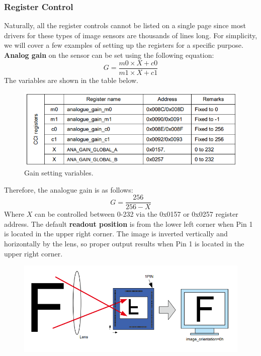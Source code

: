 \documentclass[10pt]{article}
\begin{document}
\begin{multicols}{2}
\subsubsection{Register Control}
Naturally, all the register controls cannot be listed on a single page since most drivers for these types of image sensors are thousands of lines long. For simplicity, we will cover a few examples of setting up the registers for a specific purpose.
\newline \newline
\textbf{Analog gain} on the sensor can be set using the following equation:
\[
G=\frac{m0\times X+c0}{m1\times X + c1}
\]
The variables are shown in the table below.
\begin{figure}[H]
    \centering
    \includegraphics[width=1\linewidth]{Images/Week 2/gain-table.png}
    \caption{Gain setting variables.}
\end{figure}
Therefore, the analogue gain is as follows:
\[
G = \frac{256}{256-X}
\]
Where $X$ can be controlled between 0-232 via the 0x0157 or 0x0257 register address.
\newline \newline
The default \textbf{readout position} is from the lower left corner when Pin 1 is located in the upper right corner. The image is inverted vertically and horizontally by the lens, so proper output results when Pin 1 is located in the upper right corner.
\begin{figure}[H]
    \centering
    \includegraphics[width=1\linewidth]{Images/Week 2/readout-pos.png}

\end{figure}
\end{multicols}
\end{document}
